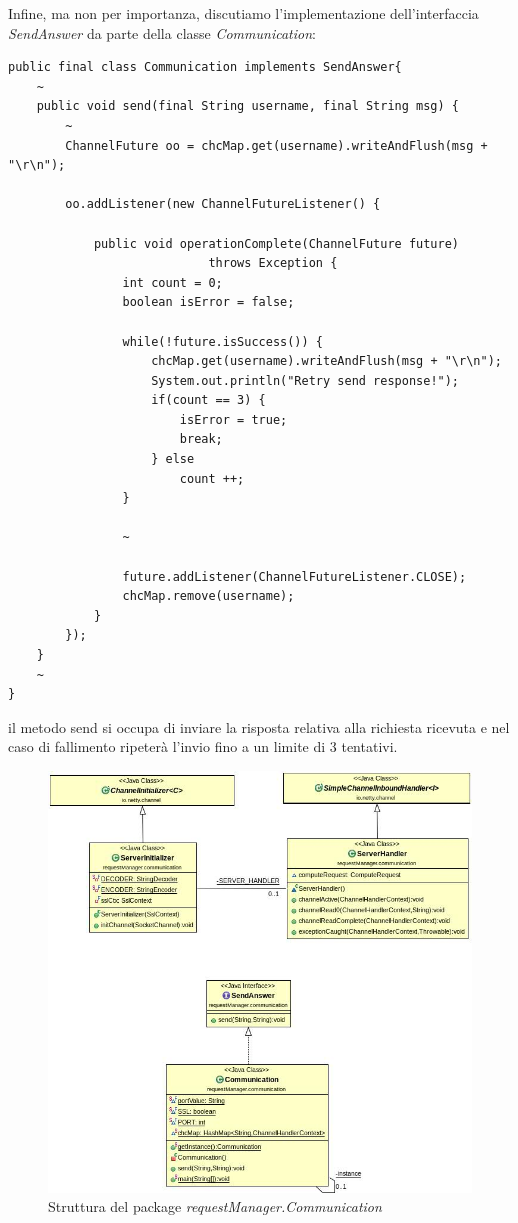 Infine, ma non per importanza, discutiamo l'implementazione dell'interfaccia \textit{SendAnswer} da parte della classe \textit{Communication}:
\begin{lstlisting}
public final class Communication implements SendAnswer{
	~
	public void send(final String username, final String msg) {
		~
		ChannelFuture oo = chcMap.get(username).writeAndFlush(msg + "\r\n");
		
		oo.addListener(new ChannelFutureListener() {
		
			public void operationComplete(ChannelFuture future)	
							throws Exception {
				int count = 0;
				boolean isError = false;
				
				while(!future.isSuccess()) {
					chcMap.get(username).writeAndFlush(msg + "\r\n");
					System.out.println("Retry send response!");
					if(count == 3) {
						isError = true;
						break;
					} else 
						count ++;
				}
				
				~
				
				future.addListener(ChannelFutureListener.CLOSE);
				chcMap.remove(username);
			}
		});
	}
	~
}
\end{lstlisting}
il metodo send si occupa di inviare la risposta relativa alla richiesta ricevuta e nel caso di fallimento ripeterà l'invio fino a un limite di 3 tentativi.
\begin{figure}
	\includegraphics[width=\textwidth]{Immagini/CommunicationPackage}
	\caption{Struttura del package \textit{requestManager.Communication}}
	\label{fig:xx}
\end{figure}
